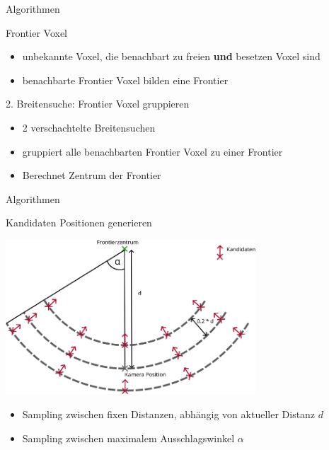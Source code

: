 \documentclass{beamer}
\begin{document}
\begin{frame}{Algorithmen}
	\begin{exampleblock}{Frontier Voxel}
		\begin{itemize}
			\item unbekannte Voxel, die benachbart zu freien \textbf{und} besetzen Voxel sind
			\item benachbarte Frontier Voxel bilden eine Frontier
		\end{itemize}
	\end{exampleblock}
	\begin{block}{2. Breitensuche: Frontier Voxel gruppieren}
		\begin{itemize}
			\item 2 verschachtelte Breitensuchen
			\item gruppiert alle benachbarten Frontier Voxel zu einer Frontier
			\item Berechnet Zentrum der Frontier
		\end{itemize}
	\end{block}
\end{frame}

\begin{frame}{Algorithmen}
	\begin{block}{Kandidaten Positionen generieren}

		\begin{center}
			\includegraphics[width=0.7\textwidth]{Graphics/view_point_gen_v2.png}
		\end{center}
		\begin{itemize}
			\item Sampling zwischen fixen Distanzen, abhängig von aktueller Distanz $d$
			\item Sampling zwischen maximalem Ausschlagswinkel $\alpha$
		\end{itemize}
	\end{block}

\end{frame}
\end{document}
